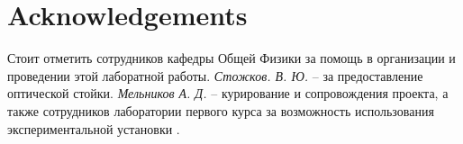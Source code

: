 \documentclass{article}
\begin{document}
\section{Acknowledgements}

Стоит отметить сотрудников кафедры Общей Физики за помощь в организации и проведении этой лаборатной работы.
\textit{Стожков. В. Ю.} -- за предоставление оптической стойки. \textit{Мельников А. Д.} -- курирование и сопровождения проекта, а
также сотрудников лаборатории первого курса за возможность использования экспериментальной установки \cite{string-lab}.

\printbibliography
\end{document}

